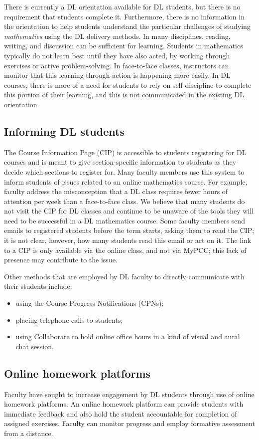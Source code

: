 There is currently a DL orientation available for DL students, but there is no
requirement that students complete it. Furthermore, there is no information in
the orientation to help students understand the particular challenges of
studying \emph{mathematics} using the DL delivery methods.  In many disciplines,
reading, writing, and discussion can be sufficient for learning. Students in
mathematics typically do not learn best until they have also acted, by working
through exercises or active problem-solving. In face-to-face classes,
instructors can monitor that this learning-through-action is happening more
easily. In DL courses, there is more of a need for students to rely on
self-discipline to complete this portion of their learning, and this is not
communicated in the existing DL orientation.


\subsection{Informing DL students}
The Course Information Page (CIP) is accessible to students registering for DL
courses and is meant to give section-specific information to students as they
decide which sections to register for.   Many faculty members use this system to
inform students of issues related to an online mathematics course.  For example,
faculty address the misconception that a DL class requires fewer hours of
attention per week than a face-to-face class. We believe that many students do
not visit the CIP for DL classes and continue to be unaware of the tools they
will need to be successful in a DL mathematics course.   Some faculty members
send emails to registered students before the term starts, asking them to read
the CIP;  it is not clear, however, how many students read this email or act on
it.  The link to a CIP is only available via the online class, and not via
MyPCC; this lack of presence may contribute to the issue.

Other methods that are employed by DL faculty to directly communicate with their
students include:
\begin{itemize}
\item using the Course Progress Notifications (CPNs);
\item placing telephone calls to students;
\item using Collaborate to hold online office hours in a kind of visual and aural chat session.
\end{itemize}

\subsection{Online homework platforms}
Faculty have sought to increase engagement by DL students through use of online
homework platforms. An online homework platform can provide students with
immediate feedback and also hold the student accountable for completion of
assigned exercises. Faculty can monitor progress and employ formative assessment
from a distance.

